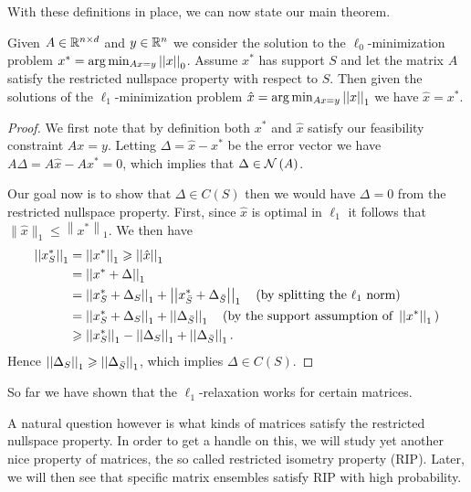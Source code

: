 \documentclass[11pt]{article}
\begin{document}
With these definitions in place, we can now state our main theorem.

\begin{theorem}
    Given $A \in \mathbb R^{n\times d}$ and $y \in \mathbb R^n$ we consider the solution to the $\ell_0$-minimization problem $x^\ast=\arg\min_{A x=y}\left|\left|x\right|\right|_{0}$. Assume \(x^\ast\) has support \(S\) and let the matrix $A$ satisfy the restricted nullspace property with respect to \(S\). Then given the solutions of the \(\ell_1\)-minimization problem $\hat{x}=\arg\min_{A x=y}\left|\left|x\right|\right|_{1}$ we have $\hat{x}=x^\ast$.
\end{theorem}

\begin{proof}
We first note that by definition both \(x^\ast\) and \(\hat{x}\) satisfy our feasibility constraint $A x=y$. Letting $\Delta=\widehat{x}-x^\ast$ be the error vector we have $A \Delta=A \hat{x}-A x^\ast=0$, which implies that \(\Delta\in\mathcal N\left(A\right)\).

Our goal now is to show that \(\Delta\in C(S)\) then we would have \(\Delta=0\) from the restricted nullspace property. First, since \(\hat{x}\) is optimal in \(\ell_1\) it follows that $\|\widehat{x}\|_{1} \leqslant\left\|x^\ast\right\|_{1}$. We then have
\[\begin{aligned}
    \left|\left|x^\ast_S\right|\right|_1 &= \left|\left|x^\ast\right|\right|_1\geqslant \left|\left|\hat x\right|\right|_1\\
    &= \left|\left|x^\ast+\Delta\right|\right|_1\\
    &= \left|\left|x^\ast_S+\Delta_S\right|\right|_1+\left|\left|x^\ast_{\bar S}+\Delta_{\bar S}\right|\right|_1\quad\textnormal{(by splitting the }\ell_1\textnormal{ norm)}\\
    &= \left|\left|x^\ast_S+\Delta_S\right|\right|_1+\left|\left|\Delta_{\bar S}\right|\right|_1\quad\textnormal{(by the support assumption of }\left|\left|x^\ast\right|\right|_1\textnormal{)}\\
    &\geqslant \left|\left|x^\ast_S\right|\right|_1-\left|\left|\Delta_S\right|\right|_1+\left|\left|\Delta_{\bar S}\right|\right|_1.
\end{aligned}\]
Hence \(\left|\left|\Delta_S\right|\right|_1\geqslant\left|\left|\Delta_{\bar S}\right|\right|_1\), which implies \(\Delta\in C(S)\).
\end{proof}

So far we have shown that the \(\ell_1\)-relaxation works for certain matrices. 

A natural question however is what kinds of matrices satisfy the restricted nullspace property. In order to get a handle on this, we will study yet another nice property of matrices, the so called restricted isometry property (RIP). Later, we will then see that specific matrix ensembles satisfy RIP with high probability.
\end{document}
